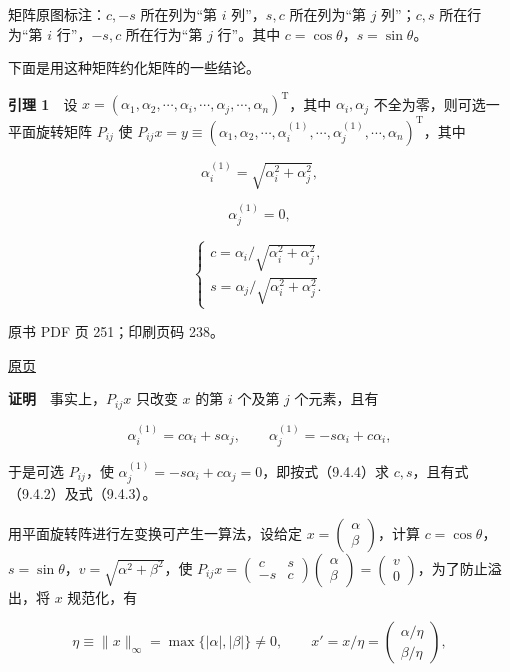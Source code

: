矩阵原图标注：\(c,-s\) 所在列为``第 \(i\) 列''，\(s,c\) 所在列为``第 \(j\) 列''；\(c,s\) 所在行为``第 \(i\) 行''，\(-s,c\) 所在行为``第 \(j\) 行''。其中 \(c=\cos\theta\)，\(s=\sin\theta\)。

下面是用这种矩阵约化矩阵的一些结论。

\textbf{引理 1}　设 \(x=(\alpha_1,\alpha_2,\cdots,\alpha_i,\cdots,\alpha_j,\cdots,\alpha_n)^{\mathrm T}\)，其中 \(\alpha_i,\alpha_j\) 不全为零，则可选一平面旋转矩阵 \(P_{ij}\) 使 \(P_{ij}x=y\equiv(\alpha_1,\alpha_2,\cdots,\alpha_i^{(1)},\cdots,\alpha_j^{(1)},\cdots,\alpha_n)^{\mathrm T}\)，其中

\[
\alpha_i^{(1)}=\sqrt{\alpha_i^2+\alpha_j^2},
\tag{9.4.2}
\]

\[
\alpha_j^{(1)}=0,
\tag{9.4.3}
\]

\[
\begin{cases}
c=\alpha_i/\sqrt{\alpha_i^2+\alpha_j^2},\\
s=\alpha_j/\sqrt{\alpha_i^2+\alpha_j^2}.
\end{cases}
\tag{9.4.4}
\]

\clearpage

原书 PDF 页 251；印刷页码 238。

\href{source-images/pdf-251.jpeg}{原页}

\textbf{证明}　事实上，\(P_{ij}x\) 只改变 \(x\) 的第 \(i\) 个及第 \(j\) 个元素，且有

\[
\alpha_i^{(1)}=c\alpha_i+s\alpha_j,\qquad
\alpha_j^{(1)}=-s\alpha_i+c\alpha_i,
\]

于是可选 \(P_{ij}\)，使 \(\alpha_j^{(1)}=-s\alpha_i+c\alpha_j=0\)，即按式（9.4.4）求 \(c,s\)，且有式（9.4.2）及式（9.4.3）。

用平面旋转阵进行左变换可产生一算法，设给定 \(x=\begin{pmatrix}\alpha\\\beta\end{pmatrix}\)，计算 \(c=\cos\theta\)，\(s=\sin\theta\)，\(v=\sqrt{\alpha^2+\beta^2}\)，使 \(P_{ij}x=\begin{pmatrix}c&s\\-s&c\end{pmatrix}\begin{pmatrix}\alpha\\\beta\end{pmatrix}=\begin{pmatrix}v\\0\end{pmatrix}\)，为了防止溢出，将 \(x\) 规范化，有

\[
\eta\equiv\|x\|_\infty=\max\{|\alpha|,|\beta|\}\ne0,\qquad
x'=x/\eta=\begin{pmatrix}\alpha/\eta\\\beta/\eta\end{pmatrix},
\]

